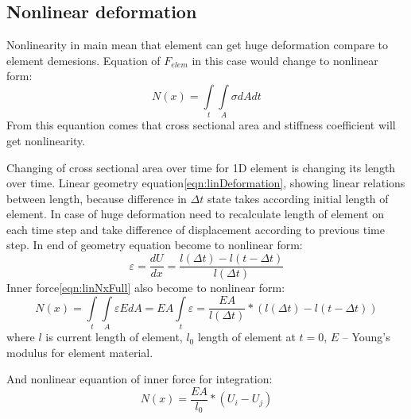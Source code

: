 \subsection*{Nonlinear deformation}
Nonlinearity in main mean that element can get huge deformation compare to
element demesions. Equation of $F_{elem}$ in this case  would change to
nonlinear form:
\begin{equation}\label{eqn:nonlinNx}
  N(x)= \int\limits_t\int\limits_A \sigma dAdt
\end{equation}
From this equantion comes that cross sectional area and stiffness coefficient
will get nonlinearity.
 \par
Changing of cross sectional area over time for 1D element is changing its length
over time. Linear geometry equation\eqref{eqn:linDeformation}, showing linear
relations between length, because difference in $\Delta t$ state takes according
initial length of element. In case of huge deformation need to recalculate
length of element on each time step and take difference of displacement
according to previous time step. In end of geometry equation become to nonlinear
form:
\begin{equation}\label{eqn:nonlinDeformation}
  \varepsilon=\frac{dU}{dx}=\frac{l(\Delta t)-l(t-\Delta t)}{l(\Delta t)}
\end{equation}
Inner force\eqref{eqn:linNxFull} also become to nonlinear form:
\begin{equation}\label{eqn:nonlinNxFull}
  N(x)= \int\limits_t\int\limits_A \varepsilon EdA=EA\int\limits_t\varepsilon=\frac{EA}{l(\Delta t)}*(l(\Delta t)-l(t-\Delta t))
\end{equation}
where $l$ is current length of element, $l_0$ length of element at $t=0$, $E$ –
Young’s modulus for element material.\par And nonlinear equantion of inner force
for integration:
\begin{equation}\label{eqn:nonlinNxWdispl}
  N(x)=\frac{EA}{l_0}*(U_{i}-U_{j})
\end{equation}\par

